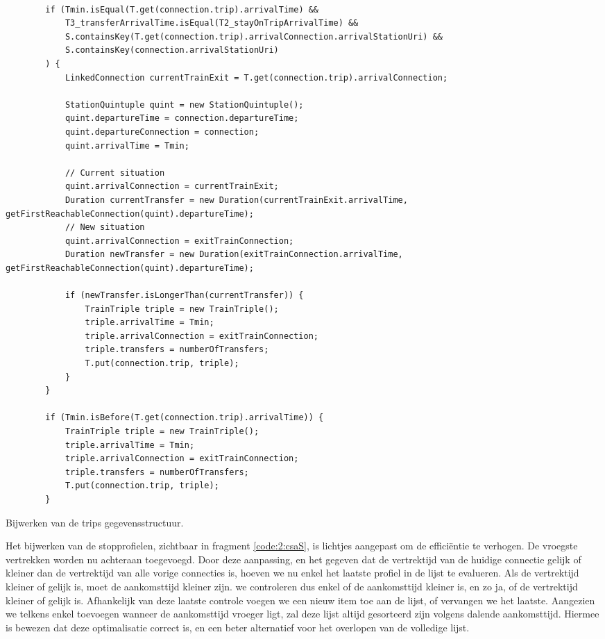 \begin{code}
	\begin{verbatim}
	
		if (Tmin.isEqual(T.get(connection.trip).arrivalTime) && 
			T3_transferArrivalTime.isEqual(T2_stayOnTripArrivalTime) &&
			S.containsKey(T.get(connection.trip).arrivalConnection.arrivalStationUri) &&
			S.containsKey(connection.arrivalStationUri)
		) {
			LinkedConnection currentTrainExit = T.get(connection.trip).arrivalConnection;
			
			StationQuintuple quint = new StationQuintuple();
			quint.departureTime = connection.departureTime;
			quint.departureConnection = connection;
			quint.arrivalTime = Tmin;
			
			// Current situation
			quint.arrivalConnection = currentTrainExit;
			Duration currentTransfer = new Duration(currentTrainExit.arrivalTime, getFirstReachableConnection(quint).departureTime);
			// New situation
			quint.arrivalConnection = exitTrainConnection;
			Duration newTransfer = new Duration(exitTrainConnection.arrivalTime, getFirstReachableConnection(quint).departureTime);
	
			if (newTransfer.isLongerThan(currentTransfer)) {
				TrainTriple triple = new TrainTriple();
				triple.arrivalTime = Tmin;
				triple.arrivalConnection = exitTrainConnection;
				triple.transfers = numberOfTransfers;
				T.put(connection.trip, triple);
			}
		}
		
		if (Tmin.isBefore(T.get(connection.trip).arrivalTime)) {
			TrainTriple triple = new TrainTriple();
			triple.arrivalTime = Tmin;
			triple.arrivalConnection = exitTrainConnection;
			triple.transfers = numberOfTransfers;
			T.put(connection.trip, triple);
		}
	\end{verbatim}
	\caption[CSA: Bijwerken T]{Bijwerken van de trips gegevensstructuur.}
	\label{code:2:csaT}
\end{code}

Het bijwerken van de stopprofielen, zichtbaar in fragment \ref{code:2:csaS}, is lichtjes aangepast om de efficiëntie te verhogen. De vroegste vertrekken worden nu achteraan toegevoegd. Door deze aanpassing, en het gegeven dat de vertrektijd van de huidige connectie gelijk of kleiner dan de vertrektijd van alle vorige connecties is, hoeven we nu enkel het laatste profiel in de lijst te evalueren. Als de vertrektijd kleiner of gelijk is, moet de aankomsttijd kleiner zijn. we controleren dus enkel of de aankomsttijd kleiner is, en zo ja, of de vertrektijd kleiner of gelijk is. Afhankelijk van deze laatste controle voegen we een nieuw item toe aan de lijst, of vervangen we het laatste. Aangezien we telkens enkel toevoegen wanneer de aankomsttijd vroeger ligt, zal deze lijst altijd gesorteerd zijn volgens dalende aankomsttijd. Hiermee is bewezen dat deze optimalisatie correct is, en een beter alternatief voor het overlopen van de volledige lijst.


